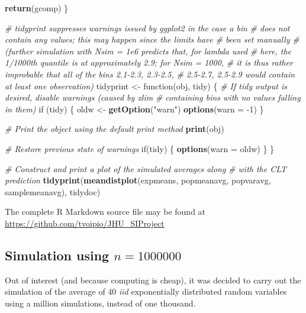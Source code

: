 \documentclass[12pt,a4paper]{article}
\newenvironment{Shaded}{\begin{snugshade}}{\end{snugshade}}
\newcommand{\KeywordTok}[1]{\textcolor[rgb]{0.13,0.29,0.53}{\textbf{{#1}}}}
\newcommand{\DataTypeTok}[1]{\textcolor[rgb]{0.13,0.29,0.53}{{#1}}}
\newcommand{\DecValTok}[1]{\textcolor[rgb]{0.00,0.00,0.81}{{#1}}}
\newcommand{\StringTok}[1]{\textcolor[rgb]{0.31,0.60,0.02}{{#1}}}
\newcommand{\CommentTok}[1]{\textcolor[rgb]{0.56,0.35,0.01}{\textit{{#1}}}}
\newcommand{\NormalTok}[1]{{#1}}
\begin{document}
\begin{Shaded}
\begin{Highlighting}[]
    \KeywordTok{return}\NormalTok{(gcomp)}
\NormalTok{\}}

\CommentTok{# tidyprint suppresses warnings issued by ggplot2 in the case a bin}
\CommentTok{# does not contain any values; this may happen since the limits have}
\CommentTok{# been set manually}
\CommentTok{# (further simulation with Nsim = 1e6 predicts that, for lambda used}
\CommentTok{# here, the 1/1000th quantile is at approximately 2.9; for Nsim = 1000,}
\CommentTok{# it is thus rather improbable that all of the bins 2.1-2.3, 2.3-2.5,}
\CommentTok{# 2.5-2.7, 2.5-2.9 would contain at least one observation)}
\NormalTok{tidyprint <-}\StringTok{ }\NormalTok{function(obj, tidy)}
\NormalTok{\{}
    \CommentTok{# If tidy output is desired, disable warnings (caused by xlim}
    \CommentTok{# containing bins with no values falling in them)}
    \NormalTok{if (tidy)}
    \NormalTok{\{}
        \NormalTok{oldw <-}\StringTok{ }\KeywordTok{getOption}\NormalTok{(}\StringTok{"warn"}\NormalTok{)}
        \KeywordTok{options}\NormalTok{(}\DataTypeTok{warn =} \NormalTok{-}\DecValTok{1}\NormalTok{)}
    \NormalTok{\}}
    
    \CommentTok{# Print the object using the default print method}
    \KeywordTok{print}\NormalTok{(obj)}
    
    \CommentTok{# Restore previous state of warnings}
    \NormalTok{if(tidy) \{ }\KeywordTok{options}\NormalTok{(}\DataTypeTok{warn =} \NormalTok{oldw) \}}
\NormalTok{\}}

\CommentTok{# Construct and print a plot of the simulated averages along}
\CommentTok{# with the CLT prediction}
\KeywordTok{tidyprint}\NormalTok{(}\KeywordTok{meandistplot}\NormalTok{(expmeans, popmeanavg, popvaravg, samplemeanavg),}
          \NormalTok{tidydoc)}
\end{Highlighting}
\end{Shaded}

The complete R Markdown source file may be found at
\url{https://github.com/tvoipio/JHU_SIProject}

\subsection{\texorpdfstring{Simulation using
\(n = 1000000\)}{Simulation using n = 1000000}}\label{simulation-using-n-1000000}

Out of interest (and because computing is cheap), it was decided to
carry out the simulation of the average of 40 \emph{iid} exponentially
distributed random variables using a million simulations, instead of one
thousand.
\end{document}
